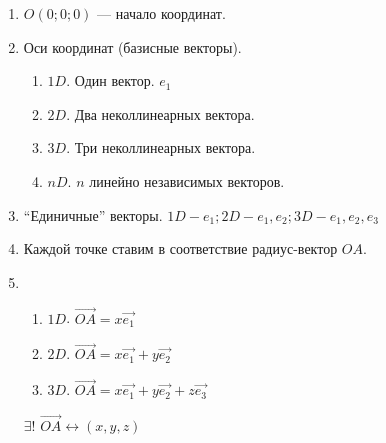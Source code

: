 \documentclass{article}
\begin{document}
    \begin{enumerate}
        \item \(O(0; 0; 0)\) --- начало координат.
        \item Оси координат (базисные векторы). 
        
        \begin{enumerate}
            \item \(1D\). Один вектор. \(e_1\)
            \item \(2D\). Два неколлинеарных вектора.
            \item \(3D\). Три неколлинеарных вектора.
            \item \(nD\). \(n\) линейно независимых векторов.
        \end{enumerate}

        \item ``Единичные'' векторы. \(1D - e_1; 2D - e_1,e_2; 3D - e_1,e_2,e_3\)
        \item Каждой точке ставим в соответствие радиус-вектор \(OA\).
        \item 
        
        \begin{enumerate}
            \item \(1D\). \(\overrightarrow{OA} = x\overrightarrow{e_1}\)
            \item \(2D\). \(\overrightarrow{OA} = x\overrightarrow{e_1} + y\overrightarrow{e_2}\)
            \item \(3D\). \(\overrightarrow{OA} = x\overrightarrow{e_1} + y\overrightarrow{e_2} + z\overrightarrow{e_3}\)
        \end{enumerate}

        \(\exists!\) \( \overrightarrow{OA} \longleftrightarrow (x, y, z) \)
    \end{enumerate}
\end{document}

